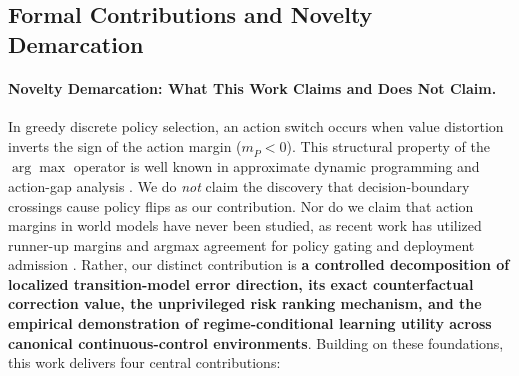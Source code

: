 \documentclass[journal,10pt,twocolumn]{IEEEtran}
\begin{document}
\subsection{Formal Contributions and Novelty Demarcation}
\label{subsec:formal_contributions}

\paragraph{Novelty Demarcation: What This Work Claims and Does Not Claim.}
In greedy discrete policy selection, an action switch occurs when value distortion inverts the sign of the action margin ($m_{\hat{P}} < 0$). This structural property of the $\arg\max$ operator is well known in approximate dynamic programming and action-gap analysis \cite{farahmand2011action, bellemare2016increasing}. 
We do \emph{not} claim the discovery that decision-boundary crossings cause policy flips as our contribution. Nor do we claim that action margins in world models have never been studied, as recent work has utilized runner-up margins and argmax agreement for policy gating and deployment admission \cite{causalnav2026}.
Rather, our distinct contribution is \textbf{a controlled decomposition of localized transition-model error direction, its exact counterfactual correction value, the unprivileged risk ranking mechanism, and the empirical demonstration of regime-conditional learning utility across canonical continuous-control environments}. Building on these foundations, this work delivers four central contributions:
\end{document}
